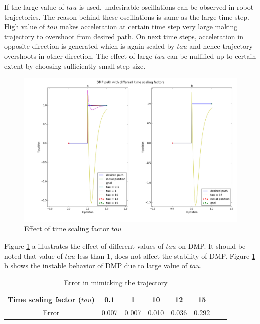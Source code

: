 If the large value of $tau$ is used, undesirable oscillations can be observed in robot trajectories. The reason behind these oscillations is same as the large time step. High value of $tau$ makes acceleration at certain time step very large making trajectory to overshoot from desired path. On next time steps, acceleration in opposite direction is generated which is again scaled by $tau$ and hence trajectory overshoots in other direction. The effect of large $tau$ can be nullified up-to certain extent by choosing sufficiently small step size. 
\begin{figure}[H]
	\includegraphics[width=\textwidth]{images/tau_.png}
	\caption{Effect of time scaling factor $tau$}
	\label{fig:tau_}
\end{figure}

Figure \ref{fig:tau_} a illustrates the effect of different values of $tau$ on DMP. It should be noted that value of $tau$ less than 1, does not affect the stability of DMP. Figure \ref{fig:tau_} b shows the instable behavior of DMP due to large value of $tau$.

\begin{center}
	\begin{table}[H]
		\centering
		\begin{tabular}{| c | c | c | c | c | c | c | c |}	
			\hline
			Time scaling factor ($tau$) & 0.1 & 1 & 10 & 12 & 15 \\       
			\hline
			Error & 0.007 & 0.007 & 0.010 & 0.036 & 0.292   \\
			\hline
		\end{tabular}
		\caption{Error in mimicking the trajectory}
	\end{table}\label{_dt_e}
\end{center}





